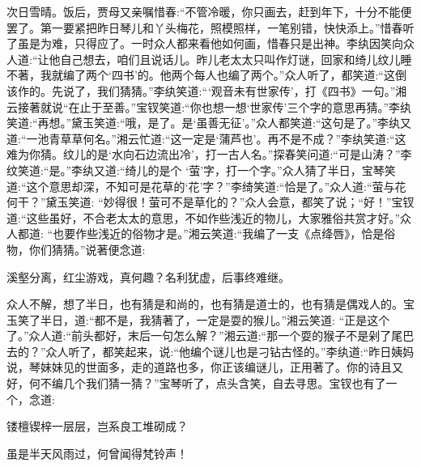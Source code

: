 \begin{parag}
    次日雪晴。饭后，贾母又亲嘱惜春:“不管冷暖，你只画去，赶到年下，十分不能便罢了。第一要紧把昨日琴儿和丫头梅花，照模照样，一笔别错，快快添上。”惜春听了虽是为难，只得应了。一时众人都来看他如何画，惜春只是出神。李纨因笑向众人道:“让他自己想去，咱们且说话儿。昨儿老太太只叫作灯谜，回家和绮儿纹儿睡不著，我就编了两个‘四书’的。他两个每人也编了两个。”众人听了，都笑道:“这倒该作的。先说了，我们猜猜。”李纨笑道:“‘观音未有世家传’，打《四书》一句。”湘云接著就说“在止于至善。”宝钗笑道:“你也想一想‘世家传’三个字的意思再猜。”李纨笑道:“再想。”黛玉笑道:“哦，是了。是‘虽善无征’。”众人都笑道:“这句是了。”李纨又道:“一池青草草何名。”湘云忙道:“这一定是‘蒲芦也’。再不是不成？”李纨笑道:“这难为你猜。纹儿的是‘水向石边流出冷’，打一古人名。”探春笑问道:“可是山涛？”李纹笑道:“是。”李纨又道:“绮儿的是个 ‘萤’字，打一个字。”众人猜了半日，宝琴笑道:“这个意思却深，不知可是花草的‘花’字？”李绮笑道:“恰是了。”众人道:“萤与花何干？”黛玉笑道: “妙得很！萤可不是草化的？”众人会意，都笑了说；“好！”宝钗道:“这些虽好，不合老太太的意思，不如作些浅近的物儿，大家雅俗共赏才好。”众人都道: “也要作些浅近的俗物才是。”湘云笑道:“我编了一支《点绛唇》，恰是俗物，你们猜猜。”说著便念道:
\end{parag}


\begin{poem}
    \begin{pl}溪壑分离，红尘游戏，真何趣？名利犹虚，后事终难继。\end{pl}
\end{poem}


\begin{parag}
    众人不解，想了半日，也有猜是和尚的，也有猜是道士的，也有猜是偶戏人的。宝玉笑了半日，道:“都不是，我猜著了，一定是耍的猴儿。”湘云笑道: “正是这个了。”众人道:“前头都好，末后一句怎么解？”湘云道:“那一个耍的猴子不是剁了尾巴去的？”众人听了，都笑起来，说:“他编个谜儿也是刁钻古怪的。”李纨道:“昨日姨妈说，琴妹妹见的世面多，走的道路也多，你正该编谜儿，正用著了。你的诗且又好，何不编几个我们猜一猜？”宝琴听了，点头含笑，自去寻思。宝钗也有了一个，念道:
\end{parag}


\begin{poem}
    \begin{pl}镂檀锲梓一层层，岂系良工堆砌成？\end{pl}

    \begin{pl}虽是半天风雨过，何曾闻得梵铃声！\end{pl}

\end{poem}


